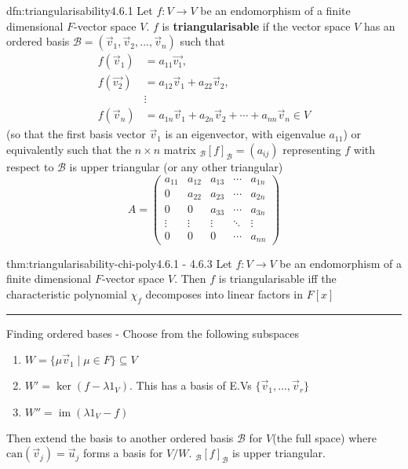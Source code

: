 \documentclass[landscape, 8pt]{extarticle}
\DeclareMathOperator{\im}{im}
\begin{document}
\begin{multicols}{3}
\begin{dfn}[Triangularisability]{dfn:triangularisability}{4.6.1}
    Let $f : V \to V$ be an endomorphism of a finite dimensional $F$-vector space $V$. $f$ is \textbf{triangularisable} if the vector space $V$ has an ordered basis $\mathcal{B} = (\vec{v}_{1}, \vec{v}_{2},\dots,\vec{v}_{n})$ such that
        \begin{align*}
            f(\vec{v}_{1}) &= a_{11}\vec{v_{1}}, \\
            f(\vec{v_{2}}) &= a_{12}\vec{v}_{1} + a_{22}\vec{v}_{2}, \\
            &\vdots \\
            f(\vec{v}_{n}) &= a_{1n}\vec{v}_{1} + a_{2n}\vec{v}_{2} + \cdots + a_{nn}\vec{v}_{n}\in V
        \end{align*}
        (so that the first basis vector $\vec{v}_{1}$ is an eigenvector, with eigenvalue $a_{11}$) or equivalently such that the $n \times n$ matrix $_{\mathcal{B}}[f]_{\mathcal{B}} = (a_{ij})$ representing $f$ with respect to $\mathcal{B}$ is upper triangular (or any other triangular)
        \[A = \begin{pmatrix}
            a_{11}& a_{12}& a_{13}& \cdots & a_{1n} \\
            0& a_{22}& a_{23}& \cdots& a_{2n} \\
            0 & 0& a_{33}& \cdots& a_{3n} \\
            \vdots& \vdots& \vdots& \ddots& \vdots \\
            0 & 0& 0& \cdots& a_{nn}
        \end{pmatrix}\]
\end{dfn}


\begin{thm}[]{thm:triangularisability-chi-poly}{4.6.1 - 4.6.3}
    Let $f : V \to V$ be an endomorphism of a finite dimensional $F$-vector space $V$. Then $f$ is triangularisable iff the characteristic polynomial $\chi_{f}$ decomposes into linear factors in $F[x]$

    \noindent\rule{\textwidth}{0.2pt}
    Finding ordered bases - Choose from the following subspaces
    \begin{enumerate}
        \setlength\itemsep{0em}
        \item $W = \{\mu \vec{v}_{1} \mid \mu\in F\}\subseteq V$
        \item $W' = \ker(f - \lambda 1_{V})$. This has a basis of E.Vs $\{\vec{v}_{1},\dots,\vec{v}_{r}\}$
        \item $W'' = \im (\lambda 1_{V} - f)$
    \end{enumerate}
    Then extend the basis to another ordered basis $\mathcal{B}$ for $V$(the full space) where $\text{can}(\vec{v}_{j}) = \vec{u}_{j}$ forms a basis for $V / W$. ${}_{\mathcal{B}}[f]_{\mathcal{B}}$ is upper triangular.


\end{thm}
\end{multicols}
\end{document}
